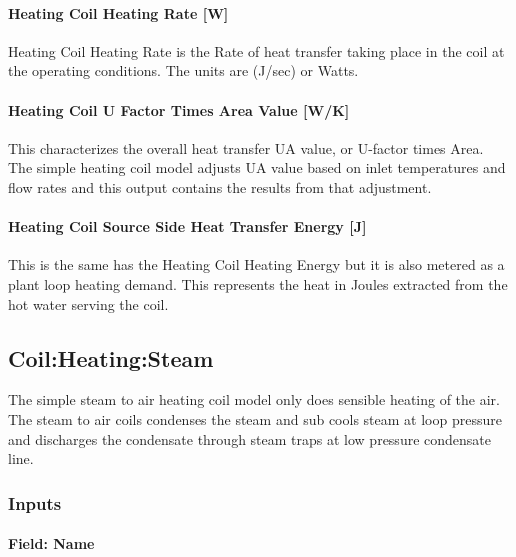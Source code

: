\paragraph{Heating Coil Heating Rate {[}W{]}}\label{heating-coil-heating-rate-w}

Heating Coil Heating Rate is the Rate of heat transfer taking place in the coil at the operating conditions. The units are (J/sec) or Watts.

\paragraph{Heating Coil U Factor Times Area Value {[}W/K{]}}\label{heating-coil-u-factor-times-area-value-wk}

This characterizes the overall heat transfer UA value, or U-factor times Area. The simple heating coil model adjusts UA value based on inlet temperatures and flow rates and this output contains the results from that adjustment.

\paragraph{Heating Coil Source Side Heat Transfer Energy {[}J{]}}\label{heating-coil-source-side-heat-transfer-energy-j}

This is the same has the Heating Coil Heating Energy but it is also metered as a plant loop heating demand. This represents the heat in Joules extracted from the hot water serving the coil.

\subsection{Coil:Heating:Steam}\label{coilheatingsteam}

The simple steam to air heating coil model only does sensible heating of the air. The steam to air coils condenses the steam and sub cools steam at loop pressure and discharges the condensate through steam traps at low pressure condensate line.

\subsubsection{Inputs}\label{inputs-2-019}

\paragraph{Field: Name}\label{field-name-2-018}

